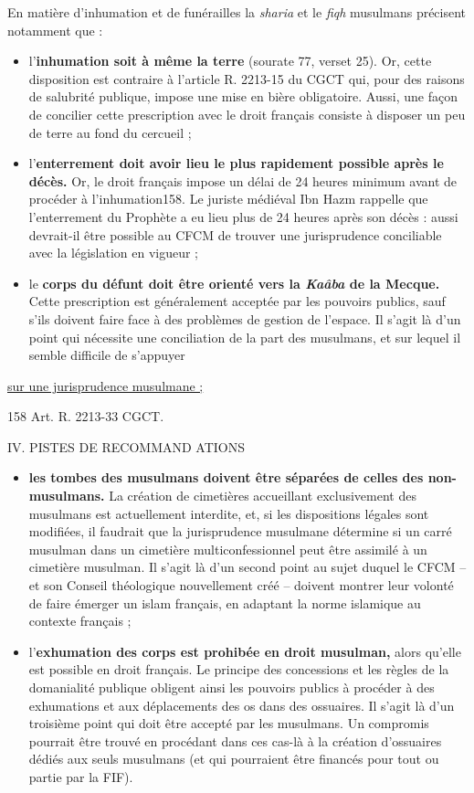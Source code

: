 En matière d'inhumation et de funérailles la \emph{sharia} et le
\emph{fiqh} musulmans précisent notamment que :


\begin{itemize}
\item
  l'\textbf{inhumation soit à même la terre} (sourate 77, verset 25).
  Or, cette disposition est contraire à l'article R. 2213-15 du CGCT
  qui, pour des raisons de salubrité publique, impose une mise en bière
  obligatoire. Aussi, une façon de concilier cette prescription avec le
  droit français consiste à disposer un peu de terre au fond du cercueil
  ;
\item
  l'\textbf{enterrement doit avoir lieu le plus rapidement possible
  après le décès.} Or, le droit français impose un délai de 24 heures
  minimum avant de procéder à l'inhumation158. Le juriste médiéval Ibn
  Hazm rappelle que l'enterrement du Prophète a eu lieu plus de 24
  heures après son décès : aussi devrait-il être possible au CFCM de
  trouver une jurisprudence conciliable avec la législation en vigueur ;
\item
  le \textbf{corps du défunt doit être orienté vers la \emph{Kaâba} de
  la Mecque.} Cette prescription est généralement acceptée par les
  pouvoirs publics, sauf s'ils doivent faire face à des problèmes de
  gestion de l'espace. Il s'agit là d'un point qui nécessite une
  conciliation de la part des musulmans, et sur lequel il semble
  difficile de s'appuyer
\end{itemize}


\underline{sur une jurisprudence musulmane ;}

158 Art. R. 2213-33 CGCT.

IV. PISTES DE RECOMMAND ATIONS


\begin{itemize}
\item
  \textbf{les tombes des musulmans doivent être séparées de celles des
  non-musulmans.} La création de cimetières accueillant exclusivement
  des musulmans est actuellement interdite, et, si les dispositions
  légales sont modifiées, il faudrait que la jurisprudence musulmane
  détermine si un carré musulman dans un cimetière multiconfessionnel
  peut être assimilé à un cimetière musulman. Il s'agit là d'un second
  point au sujet duquel le CFCM -- et son Conseil théologique
  nouvellement créé -- doivent montrer leur volonté de faire émerger un
  islam français, en adaptant la norme islamique au contexte français ;
\item
  l'\textbf{exhumation des corps est prohibée en droit musulman,} alors
  qu'elle est possible en droit français. Le principe des concessions et
  les règles de la domanialité publique obligent ainsi les pouvoirs
  publics à procéder à des exhumations et aux déplacements des os dans
  des ossuaires. Il s'agit là d'un troisième point qui doit être accepté
  par les musulmans. Un compromis pourrait être trouvé en procédant dans
  ces cas-là à la création d'ossuaires dédiés aux seuls musulmans (et
  qui pourraient être financés pour tout ou partie par la FIF).
\end{itemize}

